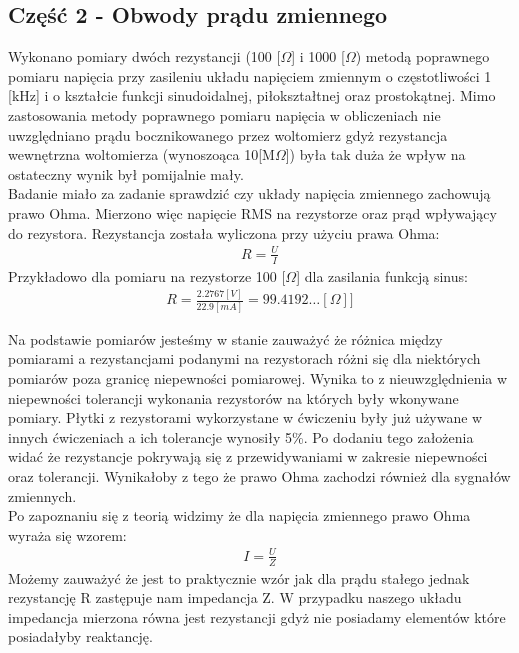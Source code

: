 \documentclass[11pt]{article}
\begin{document}
    \subsection*{Część 2 - Obwody prądu zmiennego}
    Wykonano pomiary dwóch rezystancji (100 [$\Omega$] i 1000 [$\Omega$) metodą poprawnego pomiaru napięcia przy zasileniu układu napięciem zmiennym
    o częstotliwości 1 [kHz] i o kształcie funkcji sinudoidalnej, piłokształtnej oraz prostokątnej. Mimo zastosowania metody poprawnego pomiaru napięcia w obliczeniach
    nie uwzględniano prądu bocznikowanego przez woltomierz gdyż rezystancja wewnętrzna woltomierza (wynoszoąca 10[M$\Omega$]) była tak duża że wpływ na ostateczny wynik
    był pomijalnie mały.\\
    \indent Badanie miało za zadanie sprawdzić czy układy napięcia zmiennego zachowują prawo Ohma. Mierzono więc napięcie RMS na rezystorze oraz prąd wpływający do rezystora.
    Rezystancja została wyliczona przy użyciu prawa Ohma:
    \begin{gather*}
        R=\frac{U}{I}
    \end{gather*}
    Przykładowo dla pomiaru na rezystorze 100 [$\Omega$] dla zasilania funkcją sinus:
    \begin{gather*}
        R=\frac{2.2767[V]}{22.9[mA]}=99.4192\dots [\Omega]]
    \end{gather*}
    \par Na podstawie pomiarów jesteśmy w stanie zauważyć że różnica między pomiarami a rezystancjami podanymi na rezystorach różni się dla niektórych pomiarów poza granicę niepewności pomiarowej.
    Wynika to z nieuwzględnienia w niepewności tolerancji wykonania rezystorów na których były wkonywane pomiary. Płytki z rezystorami wykorzystane w ćwiczeniu
    były już używane w innych ćwiczeniach a ich tolerancje wynosiły 5\%. Po dodaniu tego założenia widać że rezystancje pokrywają się z przewidywaniami w zakresie niepewności oraz tolerancji.
    Wynikałoby z tego że prawo Ohma zachodzi również dla sygnałów zmiennych.\\
    \indent Po zapoznaniu się z teorią widzimy że dla napięcia zmiennego prawo Ohma wyraża się wzorem:
    \begin{gather*}
        I=\frac{U}{Z}
    \end{gather*}
    \indent Możemy zauważyć że jest to praktycznie wzór jak dla prądu stałego jednak rezystancję R zastępuje nam impedancja Z. W przypadku naszego układu impedancja mierzona równa jest rezystancji
    gdyż nie posiadamy elementów które posiadałyby reaktancję.
    
\end{document}
